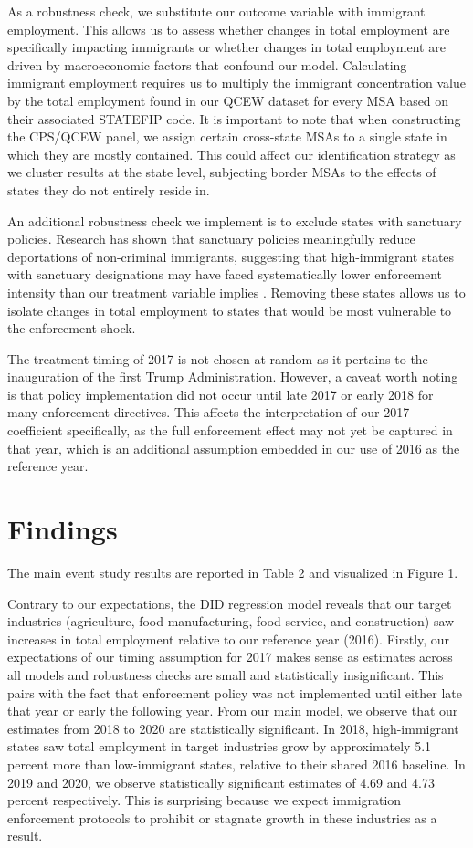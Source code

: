 \documentclass[12pt]{article}
\begin{document}
As a robustness check, we substitute our outcome variable with immigrant employment. This allows us to assess whether changes in total employment are specifically impacting immigrants or whether changes in total employment are driven by macroeconomic factors that confound our model. Calculating immigrant employment requires us to multiply the immigrant concentration value by the total employment found in our QCEW dataset for every MSA based on their associated STATEFIP code. It is important to note that when constructing the CPS/QCEW panel, we assign certain cross-state MSAs to a single state in which they are mostly contained. This could affect our identification strategy as we cluster results at the state level, subjecting border MSAs to the effects of states they do not entirely reside in.

An additional robustness check we implement is to exclude states with sanctuary policies. Research has shown that sanctuary policies meaningfully reduce deportations of non-criminal immigrants, suggesting that high-immigrant states with sanctuary designations may have faced systematically lower enforcement intensity than our treatment variable implies \citep{hausman2020}. Removing these states allows us to isolate changes in total employment to states that would be most vulnerable to the enforcement shock.

The treatment timing of 2017 is not chosen at random as it pertains to the inauguration of the first Trump Administration. However, a caveat worth noting is that policy implementation did not occur until late 2017 or early 2018 for many enforcement directives. This affects the interpretation of our 2017 coefficient specifically, as the full enforcement effect may not yet be captured in that year, which is an additional assumption embedded in our use of 2016 as the reference year.

 
\section{Findings}

The main event study results are reported in Table 2 and visualized in Figure 1.

Contrary to our expectations, the DID regression model reveals that our target industries (agriculture, food manufacturing, food service, and construction) saw increases in total employment relative to our reference year (2016). Firstly, our expectations of our timing assumption for 2017 makes sense as estimates across all models and robustness checks are small and statistically insignificant. This pairs with the fact that enforcement policy was not implemented until either late that year or early the following year. From our main model, we observe that our estimates from 2018 to 2020 are statistically significant. In 2018, high-immigrant states saw total employment in target industries grow by approximately 5.1 percent more than low-immigrant states, relative to their shared 2016 baseline. In 2019 and 2020, we observe statistically significant estimates of 4.69 and 4.73 percent respectively. This is surprising because we expect immigration enforcement protocols to prohibit or stagnate growth in these industries as a result.
\end{document}
